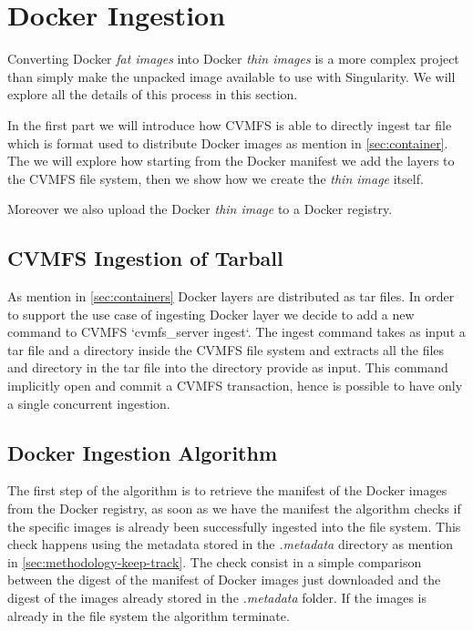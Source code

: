 \section{Docker Ingestion}

Converting Docker \textit{fat images} into Docker \textit{thin images} is a
more complex project than simply make the unpacked image available to use with
Singularity. We will explore all the details of this process in this section.

In the first part we will introduce how CVMFS is able to directly ingest tar
file which is format used to distribute Docker images as mention in
\ref{sec:container}. The we will explore how starting from the Docker manifest
we add the layers to the CVMFS file system, then we show how we create the
\textit{thin image} itself.

Moreover we also upload the Docker \textit{thin image} to a Docker registry.

\subsection{CVMFS Ingestion of Tarball}

As mention in \ref{sec:containers} Docker layers are distributed as tar files.
In order to support the use case of ingesting Docker layer we decide to add a
new command to CVMFS `cvmfs\_server ingest`. The ingest command takes as input
a tar file and a directory inside the CVMFS file system and extracts all the
files and directory in the tar file into the directory provide as input. This
command implicitly open and commit a CVMFS transaction, hence is possible to
have only a single concurrent ingestion.

\subsection{Docker Ingestion Algorithm}

The first step of the algorithm is to retrieve the manifest of the Docker
images from the Docker registry, as soon as we have the manifest the algorithm
checks if the specific images is already been successfully ingested into the
file system.  This check happens using the metadata stored in the
\textit{.metadata} directory as mention in \ref{sec:methodology-keep-track}.
The check consist in a simple comparison between the digest of the manifest of
Docker images just downloaded and the digest of the images already stored in
the \textit{.metadata} folder. If the images is already in the file system the
algorithm terminate.

